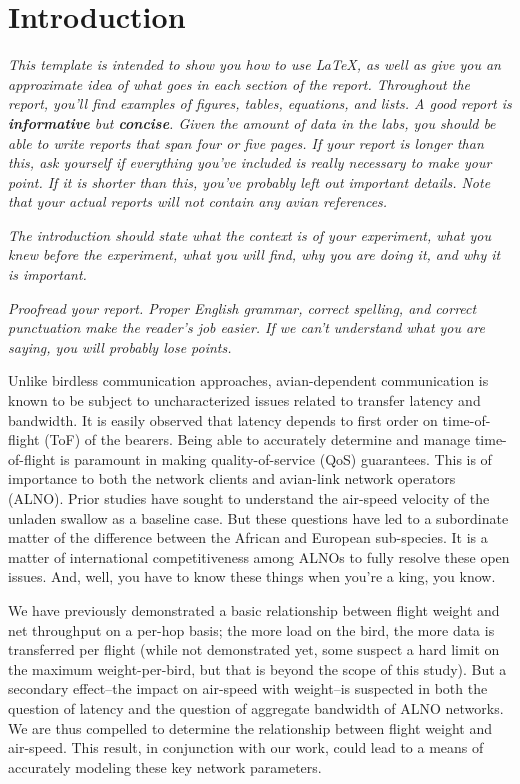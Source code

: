 \section{Introduction}
\label{sec:intro}

\emph{This template is intended to show you how to use LaTeX, as well as give you an approximate idea of what goes in each section of the report. Throughout the report, you'll find examples of figures, tables, equations, and lists. A good report is \textbf{informative}  but \textbf{concise}. Given the amount of data in the labs, you should be able to write reports that span four or five pages.  If your report is longer than this, ask yourself if everything you've included is really necessary to make your point.  If it is shorter than this, you've probably left out important details. Note that your actual reports will not contain any avian references.}

\emph{The introduction should state what the context is of your experiment, what you knew before the experiment, what you will find, why you are doing it, and why it is important.}

\emph{Proofread your report.  Proper English grammar, correct spelling, and correct punctuation make the reader's job easier.  If we can't understand what you are saying, you will probably lose points.}

Unlike birdless communication approaches, avian-dependent communication is known to be subject to uncharacterized issues related to transfer latency and bandwidth.  It is easily observed that latency depends to first order on time-of-flight (ToF) of the bearers. Being able to accurately determine and manage time-of-flight is paramount in making quality-of-service (QoS) guarantees.  This is of importance to both the network clients and avian-link network operators (ALNO).  Prior studies have sought to understand the air-speed velocity of the unladen swallow as a baseline case.  But these questions have led to a subordinate matter of the difference between the African and European sub-species.  It is a matter of international competitiveness among ALNOs to fully resolve these open issues.  And, well, you have to know these things when you're a king, you know.

We have previously demonstrated a basic relationship between flight weight and net throughput on a per-hop basis; the more load on the bird, the more data is transferred per flight (while not demonstrated yet, some suspect a hard limit on the maximum weight-per-bird, but that is beyond the scope of this study). But a secondary effect--the impact on air-speed with weight--is suspected in both the question of latency and the question of aggregate bandwidth of ALNO networks. We are thus compelled to determine the relationship between flight weight and air-speed. This result, in conjunction with our work, could lead to a means of accurately modeling these key network parameters.

